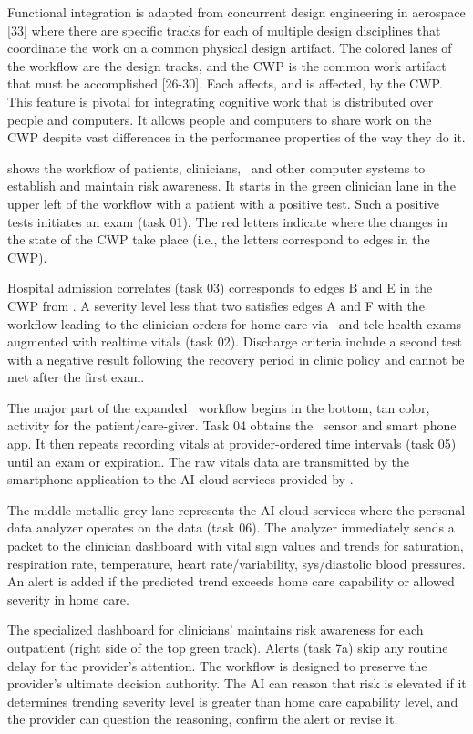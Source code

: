 Functional integration is adapted from concurrent design engineering in aerospace [33] where there are specific tracks for each of multiple design disciplines that coordinate the work on a common physical design artifact. The colored lanes of the workflow are the design tracks, and the CWP is the common work artifact that must be accomplished [26-30]. Each affects, and is affected, by the CWP. This feature is pivotal for integrating cognitive work that is distributed over people and computers. It allows people and computers to share work on the CWP despite vast differences in the performance properties of the way they do it. 

 shows the workflow of patients, clinicians, \phware\ and other computer systems to establish and maintain risk awareness. It starts in the green clinician lane in the upper left of the workflow with a patient with a positive test. Such a positive tests initiates an exam (task 01). The red letters indicate where the changes in the state of the CWP take place (i.e., the letters correspond to edges in the CWP). 

Hospital admission correlates (task 03) corresponds to edges B and E in the CWP from . A severity level less that two satisfies edges A and F with the workflow leading to the clinician orders for home care via \phware\ and tele-health exams augmented with realtime vitals (task 02). Discharge criteria include a second test with a negative result following the recovery period in clinic policy and cannot be met after the first exam.

The major part of the expanded \phware\ workflow begins in the bottom, tan color, activity for the patient/care-giver. Task 04 obtains the \phware\ sensor and smart phone app. It then repeats recording vitals at provider-ordered time intervals (task 05) until an exam or expiration. The raw vitals data are transmitted by the smartphone application to the AI cloud services provided by \phware. 

The middle metallic grey lane represents the AI cloud services where the personal data analyzer operates on the data (task 06).  The analyzer immediately sends a packet to the clinician dashboard with vital sign values and trends for saturation, respiration rate, temperature, heart rate/variability, sys/diastolic blood pressures. An alert is added if the predicted trend exceeds home care capability or allowed severity in home care.

The specialized dashboard for clinicians’ maintains risk awareness for each outpatient (right side of the top green track). Alerts (task 7a) skip any routine delay for the provider’s attention. The workflow is designed to preserve the provider’s ultimate decision authority. The AI can reason that risk is elevated if it determines trending severity level is greater than home care capability level, and the provider can question the reasoning, confirm the alert or revise it. 

